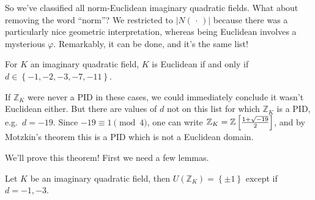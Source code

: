 \begin{remark}

So we've classified all norm-Euclidean imaginary quadratic fields. What
about removing the word ``norm''? We restricted to
\({\left\lvert {N({\,\cdot\,})} \right\rvert}\) because there was a
particularly nice geometric interpretation, whereas being Euclidean
involves a mysterious \(\varphi\). Remarkably, it can be done, and it's
the same list!

\end{remark}

\begin{theorem}[Motzkin]

For \(K\) an imaginary quadratic field, \(K\) is Euclidean if and only
if \(d\in \left\{{-1,-2,-3,-7,-11}\right\}\).

\end{theorem}

\begin{remark}

If \({\mathbb{Z}}_K\) were never a PID in these cases, we could
immediately conclude it wasn't Euclidean either. But there are values of
\(d\) not on this list for which \({\mathbb{Z}}_K\) is a PID,
e.g.~\(d=-19\). Since \(-19 \equiv 1 \pmod 4\), one can write
\({\mathbb{Z}}_K = {\mathbb{Z}}\left[ {1 + \sqrt{-19} \over 2}\right]\),
and by Motzkin's theorem this is a PID which is not a Euclidean domain.

\end{remark}

\begin{remark}

We'll prove this theorem! First we need a few lemmas.

\end{remark}

\begin{lemma}[?]

Let \(K\) be an imaginary quadratic field, then
\(U({\mathbb{Z}}_K) = \left\{{\pm 1 }\right\}\) except if \(d=-1, -3\).

\end{lemma}

